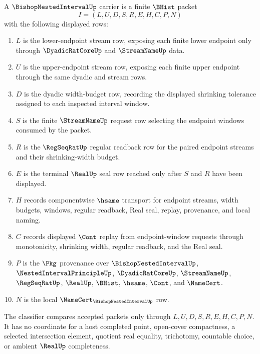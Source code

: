 \begin{definition}
\label{def:bishop-nested-interval-carrier}
A $\BishopNestedIntervalUp$ carrier is a finite $\BHist$ packet
$$
I=(L,U,D,S,R,E,H,C,P,N)
$$
with the following displayed rows:
\begin{enumerate}
\item $L$ is the lower-endpoint stream row, exposing each finite lower endpoint only through $\DyadicRatCoreUp$ and $\StreamNameUp$ data.
\item $U$ is the upper-endpoint stream row, exposing each finite upper endpoint through the same dyadic and stream rows.
\item $D$ is the dyadic width-budget row, recording the displayed shrinking tolerance assigned to each inspected interval window.
\item $S$ is the finite $\StreamNameUp$ request row selecting the endpoint windows consumed by the packet.
\item $R$ is the $\RegSeqRatUp$ regular readback row for the paired endpoint streams and their shrinking-width budget.
\item $E$ is the terminal $\RealUp$ seal row reached only after $S$ and $R$ have been displayed.
\item $H$ records componentwise $\hsame$ transport for endpoint streams, width budgets, windows, regular readback, Real seal, replay, provenance, and local naming.
\item $C$ records displayed $\Cont$ replay from endpoint-window requests through monotonicity, shrinking width, regular readback, and the Real seal.
\item $P$ is the $\Pkg$ provenance over $\BishopNestedIntervalUp$, $\NestedIntervalPrincipleUp$, $\DyadicRatCoreUp$, $\StreamNameUp$, $\RegSeqRatUp$, $\RealUp$, $\BHist$, $\hsame$, $\Cont$, and $\NameCert$.
\item $N$ is the local $\NameCert_{\BishopNestedIntervalUp}$ row.
\end{enumerate}
The classifier compares accepted packets only through $L,U,D,S,R,E,H,C,P,N$. It has no coordinate for a host completed point, open-cover compactness, a selected intersection element, quotient real equality, trichotomy, countable choice, or ambient $\RealUp$ completeness.
\end{definition}

